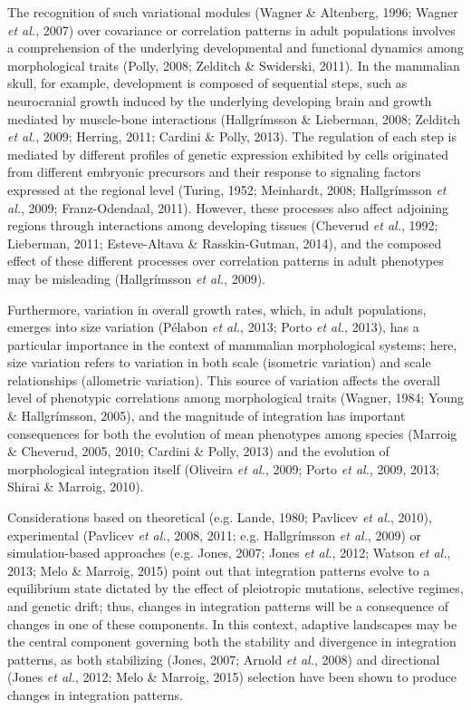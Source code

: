 \documentclass[12pt,]{article}
\begin{document}
The recognition of such variational modules (Wagner \& Altenberg, 1996;
Wagner \emph{et al.}, 2007) over covariance or correlation patterns in
adult populations involves a comprehension of the underlying
developmental and functional dynamics among morphological traits (Polly,
2008; Zelditch \& Swiderski, 2011). In the mammalian skull, for example,
development is composed of sequential steps, such as neurocranial growth
induced by the underlying developing brain and growth mediated by
muscle-bone interactions (Hallgrímsson \& Lieberman, 2008; Zelditch
\emph{et al.}, 2009; Herring, 2011; Cardini \& Polly, 2013). The
regulation of each step is mediated by different profiles of genetic
expression exhibited by cells originated from different embryonic
precursors and their response to signaling factors expressed at the
regional level (Turing, 1952; Meinhardt, 2008; Hallgrímsson \emph{et
al.}, 2009; Franz-Odendaal, 2011). However, these processes also affect
adjoining regions through interactions among developing tissues
(Cheverud \emph{et al.}, 1992; Lieberman, 2011; Esteve-Altava \&
Rasskin-Gutman, 2014), and the composed effect of these different
processes over correlation patterns in adult phenotypes may be
misleading (Hallgrímsson \emph{et al.}, 2009).

Furthermore, variation in overall growth rates, which, in adult
populations, emerges into size variation (Pélabon \emph{et al.}, 2013;
Porto \emph{et al.}, 2013), has a particular importance in the context
of mammalian morphological systems; here, size variation refers to
variation in both scale (isometric variation) and scale relationships
(allometric variation). This source of variation affects the overall
level of phenotypic correlations among morphological traits (Wagner,
1984; Young \& Hallgrímsson, 2005), and the magnitude of integration has
important consequences for both the evolution of mean phenotypes among
species (Marroig \& Cheverud, 2005, 2010; Cardini \& Polly, 2013) and
the evolution of morphological integration itself (Oliveira \emph{et
al.}, 2009; Porto \emph{et al.}, 2009, 2013; Shirai \& Marroig, 2010).

Considerations based on theoretical (e.g. Lande, 1980; Pavlicev \emph{et
al.}, 2010), experimental (Pavlicev \emph{et al.}, 2008, 2011; e.g.
Hallgrímsson \emph{et al.}, 2009) or simulation-based approaches (e.g.
Jones, 2007; Jones \emph{et al.}, 2012; Watson \emph{et al.}, 2013; Melo
\& Marroig, 2015) point out that integration patterns evolve to a
equilibrium state dictated by the effect of pleiotropic mutations,
selective regimes, and genetic drift; thus, changes in integration
patterns will be a consequence of changes in one of these components. In
this context, adaptive landscapes may be the central component governing
both the stability and divergence in integration patterns, as both
stabilizing (Jones, 2007; Arnold \emph{et al.}, 2008) and directional
(Jones \emph{et al.}, 2012; Melo \& Marroig, 2015) selection have been
shown to produce changes in integration patterns.
\end{document}
